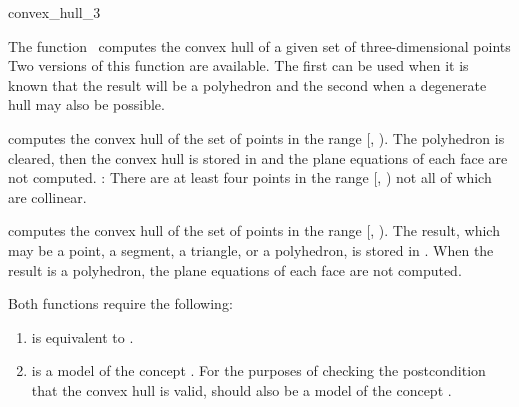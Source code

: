 \begin{ccRefFunction}{convex_hull_3}

\ccDefinition

The function \ccRefName\ computes the convex hull of a given set of 
three-dimensional points 
Two versions of this function 
are available.  The first can be used when it is known that the result
will be a polyhedron and the second when a degenerate hull
may also be possible.


{
computes the convex hull of the set of points in the range
[, ).  The polyhedron  is cleared, then
the convex hull is stored in  
and the plane equations of each face are not computed.
\ccPrecond: There are at least four points in the range 
[, ) not all of which are collinear.
}

{
computes the convex hull of the set of points in the range
[, ).  The result, which may be a point, a segment,
a triangle, or a polyhedron, is stored in .  When
the result is a polyhedron, the plane equations of each face are not computed.
}

Both functions require the following:
\begin{enumerate}
   \item {} is equivalent to .
   \item {} is a model of the concept 
         .  
         For the purposes of checking the postcondition that the convex hull
         is valid,  should also be a model of the concept
         .
\end{enumerate}


\end{ccRefFunction}
